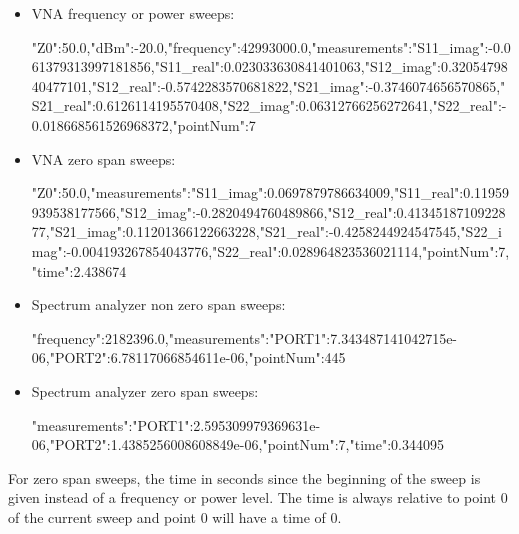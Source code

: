 \documentclass[a4paper,11pt]{article}
\begin{document}
\begin{itemize}
\item VNA frequency or power sweeps:
\begin{example}
{"Z0":50.0,"dBm":-20.0,"frequency":42993000.0,"measurements":{"S11_imag":-0.061379313997181856,"S11_real":0.023033630841401063,"S12_imag":0.3205479840477101,"S12_real":-0.5742283570681822,"S21_imag":-0.3746074656570865,"S21_real":0.6126114195570408,"S22_imag":0.06312766256272641,"S22_real":-0.018668561526968372},"pointNum":7}
\end{example}
\item VNA zero span sweeps:
\begin{example}
{"Z0":50.0,"measurements":{"S11_imag":0.0697879786634009,"S11_real":0.11959939538177566,"S12_imag":-0.2820494760489866,"S12_real":0.4134518710922877,"S21_imag":0.11201366122663228,"S21_real":-0.4258244924547545,"S22_imag":-0.004193267854043776,"S22_real":0.028964823536021114},"pointNum":7,"time":2.438674}
\end{example}
\item Spectrum analyzer non zero span sweeps:
\begin{example}
{"frequency":2182396.0,"measurements":{"PORT1":7.343487141042715e-06,"PORT2":6.78117066854611e-06},"pointNum":445}
\end{example}
\item Spectrum analyzer zero span sweeps:
\begin{example}
{"measurements":{"PORT1":2.595309979369631e-06,"PORT2":1.4385256008608849e-06},"pointNum":7,"time":0.344095}
\end{example}
\end{itemize}

For zero span sweeps, the time in seconds since the beginning of the sweep is given instead of a frequency or power level. The time is always relative to point 0 of the current sweep and point 0 will have a time of 0.
\end{document}
